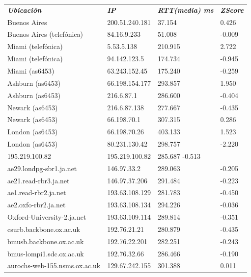 \begin{tabular}{llll}
	\textit{\textbf{Ubicaci\'on}}	&	\textit{\textbf{IP}}	&	\textit{\textbf{RTT(media) ms}}	&	\textit{\textbf{ZScore}}	\\
	Buenos Aires			&	200.51.240.181	&	37.154	&	0.426	\\
	Buenos Aires (telef\'onica)	&	84.16.9.233	&	51.008	&	-0.009	\\
	Miami (telef\'onica)		&	5.53.5.138	&	210.915	&	2.722	\\
	Miami (telef\'onica)		&	94.142.123.5	&	174.734	&	-0.945	\\
	Miami (as6453)			&	63.243.152.45	&	175.240	&	-0.259	\\
	Ashburn (as6453)		&	66.198.154.177	&	293.857	&	1.950	\\
	Ashburn (as6453)		&	216.6.87.1	&	286.600	&	-0.404	\\
	Newark (as6453)			&	216.6.87.138	&	277.667	&	-0.435	\\
	Newark (as6453)			&	66.198.70.1	&	307.315	&	0.286	\\
	London (as6453)			&	66.198.70.26	&	403.133	&	1.523	\\
	London (as6453)			&	80.231.130.42	&	298.757	&	-2.220	\\
	195.219.100.82			&	195.219.100.82	&	285.687	-0.513	\\
	ae29.londpg-sbr1.ja.net	&	146.97.33.2	&	289.063	&	-0.205	\\
	ae21.read-rbr3.ja.net	&	146.97.37.206	&	291.484	&	-0.223	\\
	ae1.read-rbr2.ja.net	&	193.63.108.129	&	281.783	&	-0.450	\\
	ae2.oxfo-rbr2.ja.net	&	193.63.108.134	&	294.226	&	-0.036	\\
	Oxford-University-2.ja.net	&	193.63.109.114	&	289.814	&	-0.351	\\
	csurb.backbone.ox.ac.uk	&	192.76.21.21	&	280.879	&	-0.435	\\
	bmusb.backbone.ox.ac.uk	&	192.76.22.201	&	282.251	&	-0.243	\\
	bmus-lompi1.sdc.ox.ac.uk	&	192.76.32.66	&	286.466	&	-0.190	\\
	aurochs-web-155.nsms.ox.ac.uk	&	129.67.242.155	&	301.388	&	0.011	\\

\end{tabular}

~

